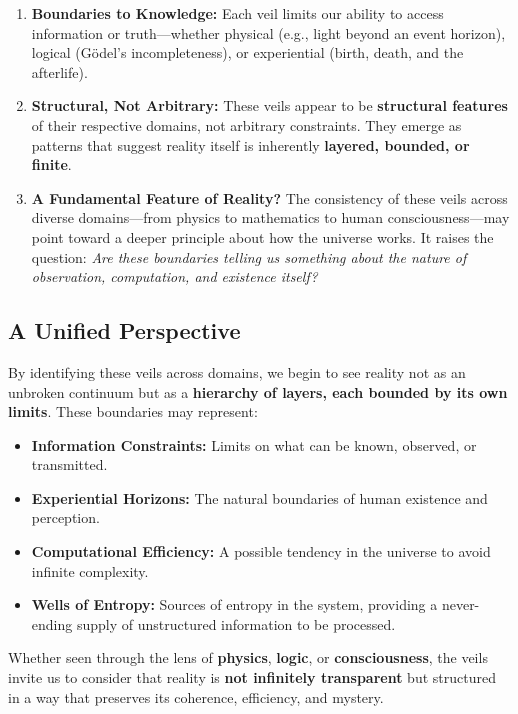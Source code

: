 \documentclass[12pt]{article}
\begin{document}
\begin{enumerate}
    \item \textbf{Boundaries to Knowledge:} Each veil limits our ability to access information or truth—whether physical (e.g., light beyond an event horizon), logical (Gödel’s incompleteness), or experiential (birth, death, and the afterlife).
    \item \textbf{Structural, Not Arbitrary:} These veils appear to be \textbf{structural features} of their respective domains, not arbitrary constraints. They emerge as patterns that suggest reality itself is inherently \textbf{layered, bounded, or finite}.
    \item \textbf{A Fundamental Feature of Reality?} The consistency of these veils across diverse domains—from physics to mathematics to human consciousness—may point toward a deeper principle about how the universe works. It raises the question: \emph{Are these boundaries telling us something about the nature of observation, computation, and existence itself?}
\end{enumerate}

\subsection{A Unified Perspective}

By identifying these veils across domains, we begin to see reality not as an unbroken continuum but as a \textbf{hierarchy of layers, each bounded by its own limits}. These boundaries may represent:
\begin{itemize}
    \item \textbf{Information Constraints:} Limits on what can be known, observed, or transmitted.
    \item \textbf{Experiential Horizons:} The natural boundaries of human existence and perception.
    \item \textbf{Computational Efficiency:} A possible tendency in the universe to avoid infinite complexity.
    \item \textbf{Wells of Entropy:} Sources of entropy in the system, providing a never-ending supply of unstructured information to be processed.
\end{itemize}

Whether seen through the lens of \textbf{physics}, \textbf{logic}, or \textbf{consciousness}, the veils invite us to consider that reality is \textbf{not infinitely transparent} but structured in a way that preserves its coherence, efficiency, and mystery.
\end{document}
